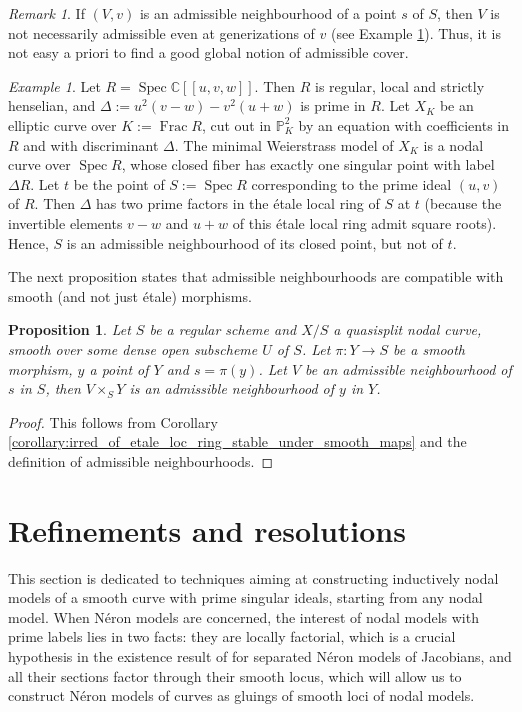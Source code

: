 \documentclass[a4paper,10pt,twoside]{article}
\renewcommand{\P}{\mathbb{P}}
\newcommand{\C}{\mathbb{C}}
\DeclareMathOperator{\spec}{Spec}
\DeclareMathOperator{\Frac}{Frac}
\newtheorem{prop}[thm]{Proposition}
\theoremstyle{definition}
\theoremstyle{remark}
\newtheorem{rem}{Remark}[thm]
\newtheorem{ex}[thm]{Example}
\begin{document}
\begin{rem}
If $(V,v)$ is an admissible neighbourhood of a point $s$ of $S$, then $V$ is not necessarily admissible even at generizations of $v$ (see Example \ref{example:irred_not_etale_irred}). Thus, it is not easy a priori to find a good global notion of admissible cover.
\end{rem}

\begin{ex}\label{example:irred_not_etale_irred}
Let $R=\spec\C[[u,v,w]]$. Then $R$ is regular, local and strictly henselian, and $\Delta:=u^2(v-w)-v^2(u+w)$ is prime in $R$. Let $X_K$ be an elliptic curve over $K:=\Frac R$, cut out in $\P^2_K$ by an equation with coefficients in $R$ and with discriminant $\Delta$. The minimal Weierstrass model of $X_K$ is a nodal curve over $\spec R$, whose closed fiber has exactly one singular point with label $\Delta R$. Let $t$ be the point of $S:=\spec R$ corresponding to the prime ideal $(u,v)$ of $R$. Then $\Delta$ has two prime factors in the étale local ring of $S$ at $t$ (because the invertible elements $v-w$ and $u+w$ of this étale local ring admit square roots). Hence, $S$ is an admissible neighbourhood of its closed point, but not of $t$.
\end{ex}

The next proposition states that admissible neighbourhoods are compatible with smooth (and not just \'etale) morphisms.


\begin{prop}\label{proposition:admissibles_compatible_with_smooth_basechange}
Let $S$ be a regular scheme and $X/S$ a quasisplit nodal curve, smooth over some dense open subscheme $U$ of $S$. Let $\pi\colon Y\to S$ be a smooth morphism, $y$ a point of $Y$ and $s=\pi(y)$. Let $V$ be an admissible neighbourhood of $s$ in $S$, then $V\times_S Y$ is an admissible neighbourhood of $y$ in $Y$.
\end{prop}

\begin{proof}
This follows from Corollary \ref{corollary:irred_of_etale_loc_ring_stable_under_smooth_maps} and the definition of admissible neighbourhoods.
\end{proof}


\section{Refinements and resolutions}\label{section1}
This section is dedicated to techniques aiming at constructing inductively nodal models of a smooth curve with prime singular ideals, starting from any nodal model. When Néron models are concerned, the interest of nodal models with prime labels lies in two facts: they are locally factorial, which is a crucial hypothesis in the existence result of \cite{Holmes} for separated Néron models of Jacobians, and all their sections factor through their smooth locus, which will allow us to construct Néron models of curves as gluings of smooth loci of nodal models.
\end{document}
